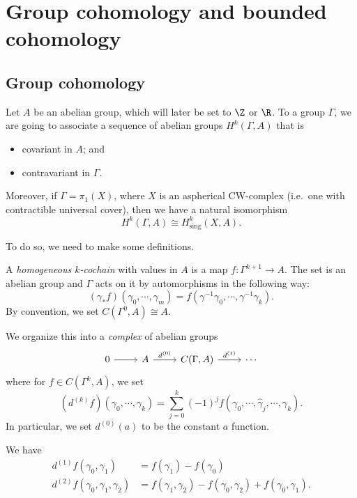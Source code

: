 \documentclass[a4paper]{article}
\begin{document}
\section{Group cohomology and bounded cohomology}
\subsection{Group cohomology}
Let $A$ be an abelian group, which will later be set to $\Z$ or $\R$. To a group $\Gamma$, we are going to associate a sequence of abelian groups $H^k(\Gamma, A)$ that is
\begin{itemize}
  \item covariant in $A$; and
  \item contravariant in $\Gamma$.
\end{itemize}
Moreover, if $\Gamma = \pi_1(X)$, where $X$ is an aspherical CW-complex (i.e.\ one with contractible universal cover), then we have a natural isomorphism
\[
  H^k(\Gamma, A) \cong H^k_{\mathrm{sing}}(X, A).
\]

To do so, we need to make some definitions.
\begin{defi}
  A \emph{homogeneous $k$-cochain} with values in $A$ is a map $f: \Gamma^{k + 1} \to A$. The set  is an abelian group and $\Gamma$ acts on it by automorphisms in the following way:
  \[
    (\gamma_* f) (\gamma_0, \cdots, \gamma_m) = f(\gamma^{-1} \gamma_0, \cdots, \gamma^{-1} \gamma_k).
  \]
  By convention, we set $C(\Gamma^0, A) \cong A$.
\end{defi}

We organize this into a \emph{complex} of abelian groups
\[
  \begin{tikzcd}
    0 \ar[r] & A \ar[r, "d^{(0)}"] & C(\Gamma, A) \ar[r, "d^{(1)}"] & \cdots
  \end{tikzcd}
\]
where for $f \in C(\Gamma^k, A)$, we set
\[
  (d^{(k)}f) (\gamma_0, \cdots, \gamma_k) = \sum_{j = 0}^k (-1)^j f(\gamma_0, \cdots, \hat{\gamma}_j, \cdots, \gamma_k).
\]
In particular, we set $d^{(0)}(a)$ to be the constant $a$ function.

\begin{eg}
  We have
  \begin{align*}
    d^{(1)} f(\gamma_0, \gamma_1) &= f(\gamma_1) - f(\gamma_0)\\
    d^{(2)} f(\gamma_0, \gamma_1, \gamma_2) &= f(\gamma_1, \gamma_2) - f(\gamma_0, \gamma_2) + f(\gamma_0, \gamma_1).
  \end{align*}
\end{eg}
\end{document}
